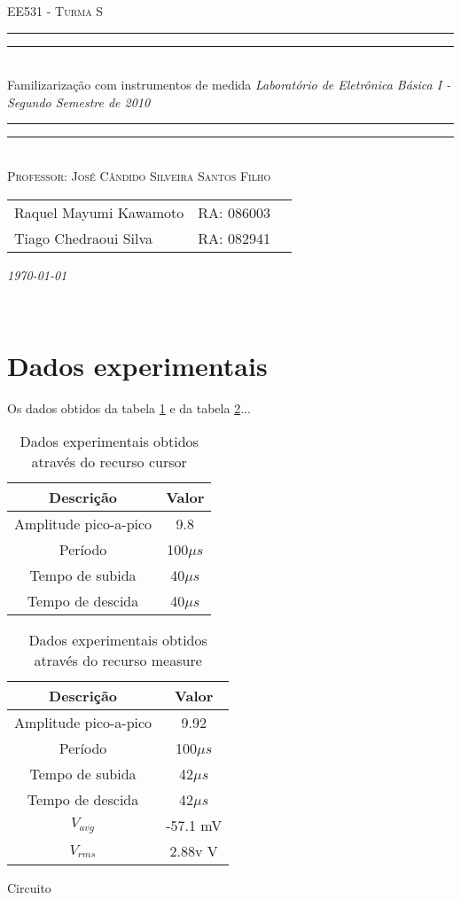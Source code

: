 \documentclass[a4paper]{article} %
\newcommand*{\titleTMB}{\begingroup \centering \settowidth{\unitlength}{\LARGE EE531} {\large\scshape EE531 - Turma S}\\[0.2\baselineskip] \rule{11.0cm}{1.6pt}\vspace*{-\baselineskip}\vspace*{2pt} \rule{11.0cm}{0.4pt}\\[\baselineskip] {\LARGE  Familizarização com instrumentos de medida}\vspace*{\baselineskip}  {\itshape Laboratório de Eletrônica Básica I - Segundo Semestre de 2010}\\ \rule{11.0cm}{0.4pt}\vspace*{-\baselineskip}\vspace{3.2pt} \rule{11.0cm}{1.6pt}\\[\baselineskip] {\large\scshape Professor: José Cândido Silveira Santos Filho}\par \vfill {\normalsize   \scshape 
    \begin{center} 
      \begin{tabular}{  l  l  p{5cm} } 
        Raquel Mayumi Kawamoto & RA: 086003\\
        Tiago Chedraoui Silva  & RA: 082941\\
      \end{tabular} \end{center}
    \itshape \today }\\[\baselineskip] \vspace{3.2pt} \endgroup}
\begin{document}
\titleTMB 
\newpage
\section{Dados experimentais}
Os dados obtidos da tabela \ref{tab:cursors} e da tabela \ref{tab:measure}...



\begin{table}[h]
\begin{centering}
\begin{tabular}{cc}
\hline 
Descrição & Valor\tabularnewline
\hline
Amplitude pico-a-pico & 9.8\tabularnewline
Período & 100$\mu s$\tabularnewline
Tempo de subida & 40$\mu s$\tabularnewline
Tempo de descida  & 40$\mu s$\tabularnewline
\hline
\end{tabular}
\par\end{centering}

\caption{Dados experimentais obtidos através do recurso cursor \label{tab:cursors}}

\end{table}



\begin{table}[h]
\begin{centering}
\begin{tabular}{cc}
\hline 
Descrição & Valor\tabularnewline
\hline
Amplitude pico-a-pico & 9.92\tabularnewline
Período & 100$\mu s$\tabularnewline
Tempo de subida & 42$\mu s$\tabularnewline
Tempo de descida  & 42$\mu s$\tabularnewline
$V_{avg}$ & -57.1 mV\tabularnewline
$V_{rms}$ & 2.88v V \tabularnewline
\hline
\end{tabular}
\par\end{centering}

\caption{Dados experimentais obtidos através do recurso measure \label{tab:measure}}

\end{table}

\begin{table}[h]
\centerline{}
\caption{Circuito \label{tab:circ}}
\end{table}

 
\end{document}
